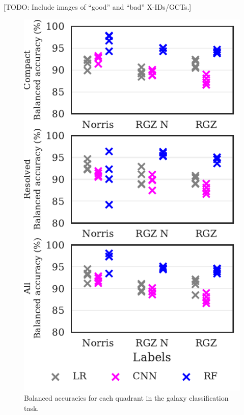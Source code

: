 \documentclass[fleqn,usenatbib,usedcolumn]{mnras}
\begin{document}
  {[}TODO: Include images of ``good'' and ``bad'' X-IDs/GCTs.{]}

  \begin{figure}
  \centering
  \includegraphics[width=\columnwidth]{images/cdfs_ba_grid.pdf}
  \caption{Balanced accuracies for each quadrant in the galaxy
  classification task.\label{fig:ba}}
  \end{figure}
\end{document}
